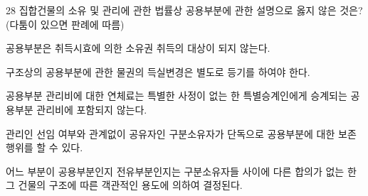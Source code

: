 \begin{question}{28}
집합건물의 소유 및 관리에 관한 법률상 공용부분에 관한 설명으로 옳지 않은 것은? (다툼이 있으면 판례에 따름)
\begin{choices}
  \item 공용부분은 취득시효에 의한 소유권 취득의 대상이 되지 않는다.
  \item 구조상의 공용부분에 관한 물권의 득실변경은 별도로 등기를 하여야 한다.
  \item 공용부분 관리비에 대한 연체료는 특별한 사정이 없는 한 특별승계인에게 승계되는 공용부분 관리비에 포함되지 않는다.
  \item 관리인 선임 여부와 관계없이 공유자인 구분소유자가 단독으로 공용부분에 대한 보존행위를 할 수 있다.
  \item 어느 부분이 공용부분인지 전유부분인지는 구분소유자들 사이에 다른 합의가 없는 한 그 건물의 구조에 따른 객관적인 용도에 의하여 결정된다.
\end{choices}
\end{question}
